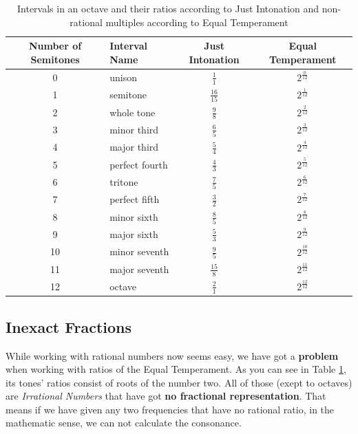 \documentclass[12pt,a4paper,titlepage,oneside]{report}
\begin{document}
\begin{table}[ht]
\renewcommand*\arraystretch{1.5}
\centering
\begin{tabular}{| c | l | c | c |}
\hline
Number of Semitones & Interval Name  &	Just Intonation & Equal Temperament   \\ \hline
0                   & unison         & $\frac{1}{1}$    & $2^{\frac{0}{12}}$  \\ \hline
1                   & semitone       & $\frac{16}{15}$  & $2^{\frac{1}{12}}$  \\ \hline
2                   & whole tone     & $\frac{9}{8}$    & $2^{\frac{2}{12}}$  \\ \hline
3                   & minor third    & $\frac{6}{5}$    & $2^{\frac{3}{12}}$  \\ \hline
4                   & major third    & $\frac{5}{4}$    & $2^{\frac{4}{12}}$  \\ \hline
5                   & perfect fourth & $\frac{4}{3}$    & $2^{\frac{5}{12}}$  \\ \hline
6                   & tritone        & $\frac{7}{5}$    & $2^{\frac{6}{12}}$  \\ \hline
7                   & perfect fifth  & $\frac{3}{2}$    & $2^{\frac{7}{12}}$  \\ \hline
8                   & minor sixth    & $\frac{8}{5}$    & $2^{\frac{8}{12}}$  \\ \hline
9                   & major sixth    & $\frac{5}{3}$    & $2^{\frac{9}{12}}$  \\ \hline
10                  & minor seventh  & $\frac{9}{5}$    & $2^{\frac{10}{12}}$ \\ \hline
11                  & major seventh  & $\frac{15}{8}$   & $2^{\frac{11}{12}}$ \\ \hline
12                  & octave         & $\frac{2}{1}$    & $2^{\frac{12}{12}}$ \\ \hline
\end{tabular}
\caption{Intervals in an octave and their ratios according to Just Intonation and non-rational multiples according to Equal Temperament}
\label{tab:intervals}
\end{table}


\subsection{Inexact Fractions}
While working with rational numbers now seems easy, we have got a \textbf{problem} when working with ratios of the Equal Temperament. As you can see in Table \ref{tab:intervals}, its tones' ratios consist of roots of the number two. All of those (exept to octaves) are \textit{Irrational Numbers} that have got \textbf{no fractional representation}. That means if we have given any two frequencies that have no rational ratio, in the mathematic sense, we can not calculate the consonance.
\end{document}
